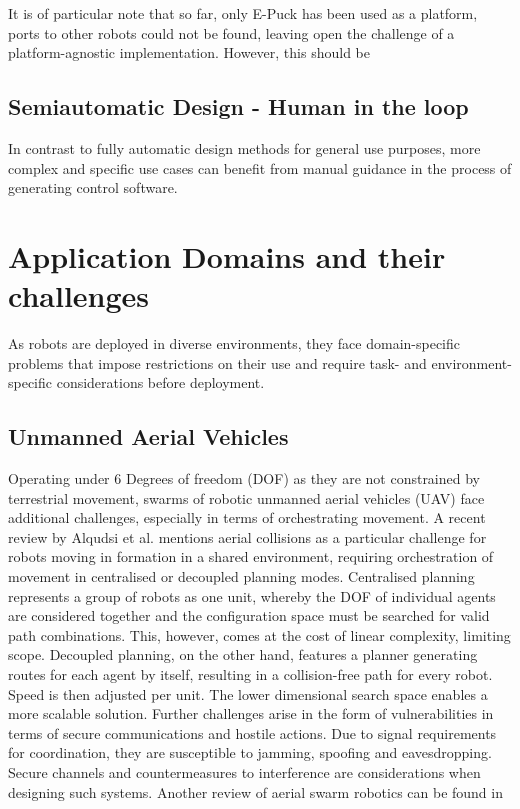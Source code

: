 \documentclass{article}
\begin{document}
It is of particular note that so far, only E-Puck has been used as a platform, ports to other robots could not be found, leaving open the challenge of a platform-agnostic implementation. However, this should be

\subsection{Semiautomatic Design - Human in the loop}
In contrast to fully automatic design methods for general use purposes, more complex and specific use cases can benefit from manual guidance in the process of generating control software. \cite{semiautomatic}

\section{Application Domains and their challenges}
As robots are deployed in diverse environments, they face domain-specific problems that impose restrictions on their use and require task- and environment-specific considerations before deployment.
\subsection{Unmanned Aerial Vehicles}
Operating under 6 Degrees of freedom (DOF) as they are not constrained by terrestrial movement, swarms of robotic unmanned aerial vehicles (UAV) face additional challenges, especially in terms of orchestrating movement. A recent review by Alqudsi et al. \cite{alqudsi2025exploring} mentions aerial collisions as a particular challenge for robots moving in formation in a shared environment, requiring orchestration of movement in centralised or decoupled planning modes. Centralised planning represents a group of robots as one unit, whereby the DOF of individual agents are considered together and the configuration space must be searched for valid path combinations. This, however, comes at the cost of linear complexity, limiting scope. \newline
Decoupled planning, on the other hand, features a planner generating routes for each agent by itself, resulting in a collision-free path for every robot. Speed is then adjusted per unit. The lower dimensional search space enables a more scalable solution.
Further challenges arise in the form of vulnerabilities in terms of secure communications and hostile actions. Due to signal requirements for coordination, they are susceptible to jamming, spoofing and eavesdropping. Secure channels and countermeasures to interference are considerations when designing such systems. \newline
Another review of aerial swarm robotics can be found in \cite{abdelkader2021aerial}
\end{document}
